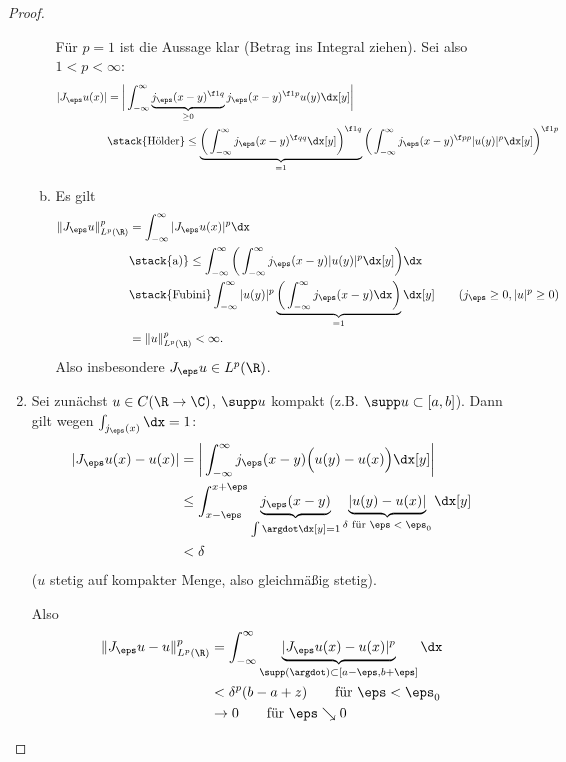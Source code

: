 \begin{st}
\begin{proof}
\begin{enumerate}[1)]
\begin{enumerate}[a)]
						Für $p=1$ ist die Aussage klar (Betrag ins Integral ziehen).
						Sei also $1 < p < \infty$:
						\begin{align*}
							|J_\eps u(x)| 
							&= \bigg| \int_{-\infty}^\infty \underbrace{j_\eps(x-y)^{\f 1q}}_{\ge 0} j_\eps(x-y)^{\f 1p} u(y) \dx[y] \bigg| \\
							&\stack{\text{Hölder}}\le \underbrace{\bigg( \int_{-\infty}^\infty j_\eps(x-y)^{\f qq} \dx[y] \bigg)^{\f 1q}}_{=1} \bigg( \int_{-\infty}^\infty j_\eps(x-y)^{\f pp} |u(y)|^p \dx[y] \bigg)^{\f 1p}
						\end{align*}
					\item
						Es gilt
						\begin{align*}
							\| J_\eps u \|_{L^p(\R)}^p
							&= \int_{-\infty}^\infty |J_\eps u(x)|^p \dx \\
							&\stack{\text{a)}}\le \int_{-\infty}^\infty \bigg( \int_{-\infty}^\infty j_\eps(x-y) |u(y)|^p \dx[y] \bigg) \dx \\
							&\stack{\text{Fubini}} \int_{-\infty}^\infty |u(y)|^p \underbrace{\bigg( \int_{-\infty}^\infty j_\eps(x-y) \dx \bigg)}_{=1} \dx[y] \qquad \text{($j_\eps \ge 0, |u|^p \ge 0$)} \\
							&= \|u\|_{L^p(\R)}^p < \infty.
						\end{align*}
						Also insbesondere $J_\eps u \in L^p(\R)$.
				\end{enumerate}
			\item
				Sei zunächst $u \in C(\R \to \C)$, $\supp u$ kompakt (z.B. $\supp u \subset [a,b]$).
				Dann gilt wegen $\int_{j_\eps(x)} \dx = 1$:
				\begin{align*}
					|J_\eps u(x) - u(x)|
					&= \bigg| \int_{-\infty}^\infty j_\eps(x-y) \Big(u(y) - u(x)\Big) \dx[y] \bigg| \\
					&\le \int_{x-\eps}^{x+\eps} \underbrace{j_\eps(x-y)}_{\int \argdot \dx[y] = 1} \underbrace{|u(y)-u(x)|}_{\delta \text{ für $\eps < \eps_0$}} \dx[y] \\
					&< \delta
				\end{align*}
				($u$ stetig auf kompakter Menge, also gleichmäßig stetig).

				Also
				\begin{align*}
					\|J_\eps u - u\|_{L^p(\R)}^p
					&= \int_{-\infty}^\infty \underbrace{|J_\eps u(x) - u(x)|^p}_{\supp(\argdot) \subset [a-\eps, b+ \eps]} \dx \\
					&< \delta^p (b-a +z) \qquad \text{für $\eps < \eps_0$} \\
					&\to 0 \qquad \text{für $\eps \searrow 0$}
				\end{align*}
		\end{enumerate}
	\end{proof}
\end{st}

